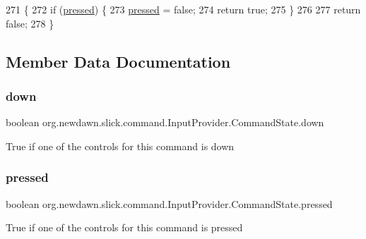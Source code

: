 \begin{DoxyCode}
271                                    \{
272             \textcolor{keywordflow}{if} (\mbox{\hyperlink{classorg_1_1newdawn_1_1slick_1_1command_1_1_input_provider_1_1_command_state_a984ed679625be22d8159a28470d7bbd8}{pressed}}) \{
273                 \mbox{\hyperlink{classorg_1_1newdawn_1_1slick_1_1command_1_1_input_provider_1_1_command_state_a984ed679625be22d8159a28470d7bbd8}{pressed}} = \textcolor{keyword}{false};
274                 \textcolor{keywordflow}{return} \textcolor{keyword}{true};
275             \}
276 
277             \textcolor{keywordflow}{return} \textcolor{keyword}{false};
278         \}
\end{DoxyCode}


\subsection{Member Data Documentation}
\mbox{\label{classorg_1_1newdawn_1_1slick_1_1command_1_1_input_provider_1_1_command_state_a8cfa0dcf27d3c3a5f389bebea44da4b4}} 
\subsubsection{\texorpdfstring{down}{down}}
{\footnotesize\ttfamily boolean org.\+newdawn.\+slick.\+command.\+Input\+Provider.\+Command\+State.\+down\hspace{0.3cm}{\ttfamily [private]}}

True if one of the controls for this command is down \mbox{\label{classorg_1_1newdawn_1_1slick_1_1command_1_1_input_provider_1_1_command_state_a984ed679625be22d8159a28470d7bbd8}} 
\subsubsection{\texorpdfstring{pressed}{pressed}}
{\footnotesize\ttfamily boolean org.\+newdawn.\+slick.\+command.\+Input\+Provider.\+Command\+State.\+pressed\hspace{0.3cm}{\ttfamily [private]}}

True if one of the controls for this command is pressed 